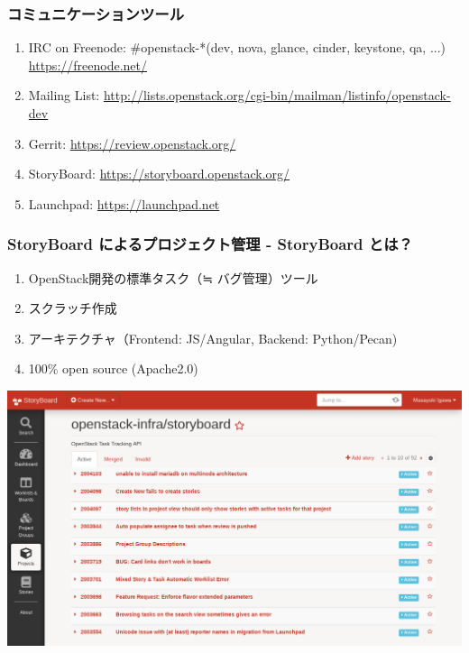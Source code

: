 \documentclass[aspectratio=169,11pt,hyperref={colorlinks=true}]{beamer}
\begin{document}
\begin{frame}
  \frametitle{コミュニケーションツール}
  \begin{enumerate}
    \item IRC on Freenode: \#openstack-*(dev, nova, glance, cinder, keystone, qa, ...) \url{https://freenode.net/}
    \item Mailing List: \url{http://lists.openstack.org/cgi-bin/mailman/listinfo/openstack-dev}
    \item Gerrit: \url{https://review.openstack.org/}
    \item StoryBoard: \url{https://storyboard.openstack.org/}
    \item Launchpad: \url{https://launchpad.net}
  \end{enumerate}
\end{frame}

\begin{frame}
  \frametitle{StoryBoard によるプロジェクト管理 - StoryBoard とは？}
  \begin{enumerate}
    \item OpenStack開発の標準タスク（≒ バグ管理）ツール
    \item スクラッチ作成
    \item アーキテクチャ（Frontend: JS/Angular, Backend: Python/Pecan)
    \item 100\% open source (Apache2.0)
  \end{enumerate}
  \centering\includegraphics[scale=0.2]{images/storyboard.png}
\end{frame}
\end{document}
